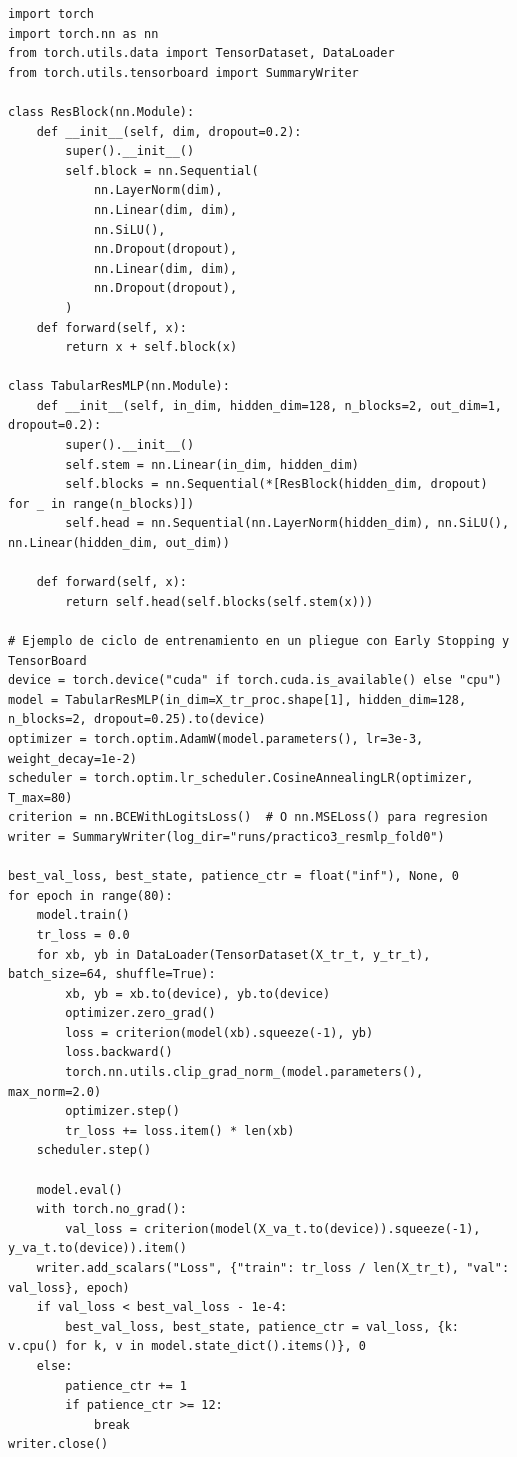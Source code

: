 \documentclass[11pt,a4paper]{article}
\begin{document}
\begin{lstlisting}[caption={Bloque PyTorch TabularResMLP, ciclo por mini-lotes con AdamW y registro en TensorBoard.}, label={lst:pytorch_dl}]
import torch
import torch.nn as nn
from torch.utils.data import TensorDataset, DataLoader
from torch.utils.tensorboard import SummaryWriter

class ResBlock(nn.Module):
    def __init__(self, dim, dropout=0.2):
        super().__init__()
        self.block = nn.Sequential(
            nn.LayerNorm(dim),
            nn.Linear(dim, dim),
            nn.SiLU(),
            nn.Dropout(dropout),
            nn.Linear(dim, dim),
            nn.Dropout(dropout),
        )
    def forward(self, x):
        return x + self.block(x)

class TabularResMLP(nn.Module):
    def __init__(self, in_dim, hidden_dim=128, n_blocks=2, out_dim=1, dropout=0.2):
        super().__init__()
        self.stem = nn.Linear(in_dim, hidden_dim)
        self.blocks = nn.Sequential(*[ResBlock(hidden_dim, dropout) for _ in range(n_blocks)])
        self.head = nn.Sequential(nn.LayerNorm(hidden_dim), nn.SiLU(), nn.Linear(hidden_dim, out_dim))

    def forward(self, x):
        return self.head(self.blocks(self.stem(x)))

# Ejemplo de ciclo de entrenamiento en un pliegue con Early Stopping y TensorBoard
device = torch.device("cuda" if torch.cuda.is_available() else "cpu")
model = TabularResMLP(in_dim=X_tr_proc.shape[1], hidden_dim=128, n_blocks=2, dropout=0.25).to(device)
optimizer = torch.optim.AdamW(model.parameters(), lr=3e-3, weight_decay=1e-2)
scheduler = torch.optim.lr_scheduler.CosineAnnealingLR(optimizer, T_max=80)
criterion = nn.BCEWithLogitsLoss()  # O nn.MSELoss() para regresion
writer = SummaryWriter(log_dir="runs/practico3_resmlp_fold0")

best_val_loss, best_state, patience_ctr = float("inf"), None, 0
for epoch in range(80):
    model.train()
    tr_loss = 0.0
    for xb, yb in DataLoader(TensorDataset(X_tr_t, y_tr_t), batch_size=64, shuffle=True):
        xb, yb = xb.to(device), yb.to(device)
        optimizer.zero_grad()
        loss = criterion(model(xb).squeeze(-1), yb)
        loss.backward()
        torch.nn.utils.clip_grad_norm_(model.parameters(), max_norm=2.0)
        optimizer.step()
        tr_loss += loss.item() * len(xb)
    scheduler.step()

    model.eval()
    with torch.no_grad():
        val_loss = criterion(model(X_va_t.to(device)).squeeze(-1), y_va_t.to(device)).item()
    writer.add_scalars("Loss", {"train": tr_loss / len(X_tr_t), "val": val_loss}, epoch)
    if val_loss < best_val_loss - 1e-4:
        best_val_loss, best_state, patience_ctr = val_loss, {k: v.cpu() for k, v in model.state_dict().items()}, 0
    else:
        patience_ctr += 1
        if patience_ctr >= 12:
            break
writer.close()
\end{lstlisting}
\end{document}
